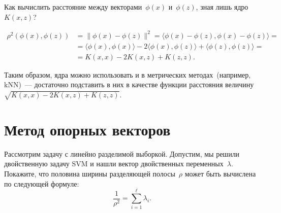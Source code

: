 \documentclass[12pt,fleqn]{article}
\begin{document}
\begin{vkProblem}
	Как вычислить расстояние между векторами~$\phi(x)$
	и~$\phi(z)$, зная лишь ядро~$K(x, z)$?
\end{vkProblem}

\begin{esSolution}
	\begin{align*}
	\rho^2(\phi(x), \phi(z))
	&=
	\|\phi(x) - \phi(z)\|^2
	=
	\langle \phi(x) - \phi(z), \phi(x) - \phi(z) \rangle
	=\\
	&=
	\langle \phi(x), \phi(x) \rangle -
	2 \langle \phi(x), \phi(z) \rangle +
	\langle \phi(z), \phi(z) \rangle
	=\\
	&=
	K(x, x) - 2 K(x, z) + K(z, z).
	\end{align*}
\end{esSolution}

Таким образом, ядра можно использовать и в метрических методах~(например, 
kNN)~---
достаточно подставить в них в качестве функции расстояния
величину~$\sqrt{K(x, x) - 2 K(x, z) + K(z, z)}$.


\section{Метод опорных векторов}
\begin{vkProblem}
    Рассмотрим задачу с линейно разделимой выборкой.
    Допустим, мы решили двойственную задачу SVM и нашли вектор двойственных переменных~$\lambda$.
    Покажите, что половина ширины разделяющей полосы~$\rho$ может быть вычислена по следующей
    формуле:
    \[
        \frac{1}{\rho^2}
        =
        \sum_{i = 1}^{\ell} \lambda_i.
    \]
\end{vkProblem}
\end{document}
